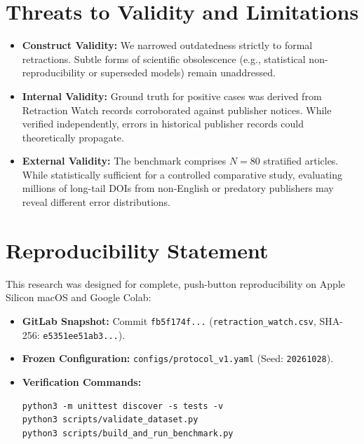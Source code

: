 \documentclass[10pt,a4paper,twocolumn]{article}
\begin{document}
\section{Threats to Validity and Limitations}
\begin{itemize}
    \item \textbf{Construct Validity:} We narrowed outdatedness strictly to formal retractions. Subtle forms of scientific obsolescence (e.g., statistical non-reproducibility or superseded models) remain unaddressed.
    \item \textbf{Internal Validity:} Ground truth for positive cases was derived from Retraction Watch records corroborated against publisher notices. While verified independently, errors in historical publisher records could theoretically propagate.
    \item \textbf{External Validity:} The benchmark comprises $N=80$ stratified articles. While statistically sufficient for a controlled comparative study, evaluating millions of long-tail DOIs from non-English or predatory publishers may reveal different error distributions.
\end{itemize}

\section{Reproducibility Statement}
This research was designed for complete, push-button reproducibility on Apple Silicon macOS and Google Colab:
\begin{itemize}
    \item \textbf{GitLab Snapshot:} Commit \texttt{fb5f174f...} (\texttt{retraction\_watch.csv}, SHA-256: \texttt{e5351ee51ab3...}).
    \item \textbf{Frozen Configuration:} \texttt{configs/protocol\_v1.yaml} (Seed: \texttt{20261028}).
    \item \textbf{Verification Commands:}
\begin{verbatim}
python3 -m unittest discover -s tests -v
python3 scripts/validate_dataset.py
python3 scripts/build_and_run_benchmark.py
\end{verbatim}
\end{itemize}
\end{document}
